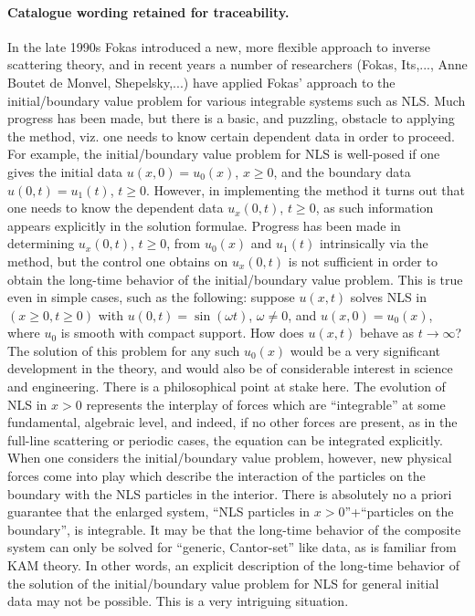 \documentclass[11pt]{article}
\begin{document}
\paragraph{Catalogue wording retained for traceability.}
In the late 1990s Fokas introduced a new, more flexible approach to inverse scattering theory, and in recent years a number of researchers (Fokas, Its,..., Anne Boutet de Monvel, Shepelsky,...) have applied Fokas' approach to the initial/boundary value problem for various integrable systems such as NLS. Much progress has been made, but there is a basic, and puzzling, obstacle to applying the method, viz. one needs to know certain dependent data in order to proceed. For example, the initial/boundary value problem for NLS is well-posed if one gives the initial data $u(x,0)=u_0(x)$, $x\geq 0$, and the boundary data $u(0,t)=u_1(t)$, $t\geq 0$. However, in implementing the method it turns out that one needs to know the dependent data $u_x(0,t)$, $t\geq 0$, as such information appears explicitly in the solution formulae. Progress has been made in determining $u_x(0,t)$, $t\geq0$, from $u_0(x)$ and $u_1(t)$ intrinsically via the method, but the control one obtains on $u_x(0,t)$ is not sufficient in order to obtain the long-time behavior of the initial/boundary value problem. This is true even in simple cases, such as the following: suppose $u(x,t)$ solves NLS in $(x\geq0,t\geq0)$ with $u(0,t)=\sin(\omega t)$, $\omega\neq0$, and $u(x,0)=u_0(x)$, where $u_0$ is smooth with compact support. How does $u(x,t)$ behave as $t\to\infty$? The solution of this problem for any such $u_0(x)$ would be a very significant development in the theory, and would also be of considerable interest in science and engineering. There is a philosophical point at stake here. The evolution of NLS in $x>0$ represents the interplay of forces which are ``integrable'' at some fundamental, algebraic level, and indeed, if no other forces are present, as in the full-line scattering or periodic cases, the equation can be integrated explicitly. When one considers the initial/boundary value problem, however, new physical forces come into play which describe the interaction of the particles on the boundary with the NLS particles in the interior. There is absolutely no a priori guarantee that the enlarged system, ``NLS particles in $x>0$''+``particles on the boundary'', is integrable. It may be that the long-time behavior of the composite system can only be solved for ``generic, Cantor-set'' like data, as is familiar from KAM theory. In other words, an explicit description of the long-time behavior of the solution of the initial/boundary value problem for NLS for general initial data may not be possible. This is a very intriguing situation.
\end{document}
